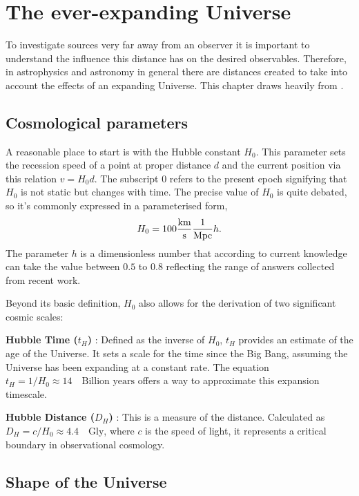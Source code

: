\section{The ever-expanding Universe}
To investigate sources very far away from an observer it is important to understand the influence this distance 
has on the desired observables. Therefore, in astrophysics and astronomy in general there are distances created to take into account the effects of an expanding Universe. 
This chapter draws heavily from \cite{hogg2000distance}. 


\subsection{Cosmological parameters}

A reasonable place to start is with the Hubble constant $H_0$. 
This parameter sets the recession speed of a point at proper distance $d$ and the current position via this relation $v = H_0 d$. 
The subscript $0$ refers to the present epoch signifying that $H_0$ is not static but changes with time. 
The precise value of $H_0$ is quite debated, so it's commonly expressed in a parameterised form,
$$
H_0= 100\frac{\rm km}{\rm s}\frac{1}{\rm Mpc} h.
$$
The parameter $h$ is a dimensionless number that according to current knowledge can take the value between $0.5$ to $0.8$ reflecting the range of answers collected from recent work. 

Beyond its basic definition, $H_0$ also allows for the derivation of two significant cosmic scales:

\textbf{Hubble Time ($t_H$) }: Defined as the inverse of 
$H_0$, $t_H$ provides an estimate of the age of the Universe. 
It sets a scale for the time since the Big Bang, assuming the Universe has been expanding at a constant rate. The equation 
$t_H = 1/H_0 \approx 14 \quad\text{Billion years}$ offers a way to approximate this expansion timescale.


\textbf{Hubble Distance ($D_H$) }: This is a measure of the distance. Calculated as 
$D_H = c/H_0 \approx 4.4 \quad \text{Gly}$, where $c$ is the speed of light, 
it represents a critical boundary in observational cosmology. %

\subsection{Shape of the Universe}


